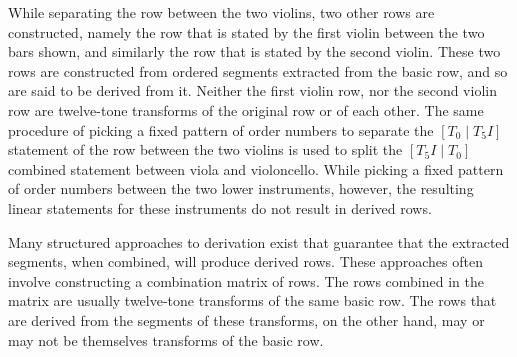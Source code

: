 \noindent While separating the row between the two violins, two other rows are constructed, namely the row that is stated by the first violin between the two bars shown, and similarly the row that is stated by the second violin. These two rows are constructed from ordered segments extracted from the basic row, and so are said to be derived from it. Neither the first violin row, nor the second violin row are twelve-tone transforms of the original row or of each other. The same procedure of picking a fixed pattern of order numbers to separate the $[T_0 \; | \; T_5I]$ statement of the row between the two violins is used to split the $[T_5I \; | \; T_0]$ combined statement between viola and violoncello. While picking a fixed pattern of order numbers between the two lower instruments, however, the resulting linear statements for these instruments do not result in derived rows.

Many structured approaches to derivation exist that guarantee that the extracted segments, when combined, will produce derived rows. These approaches often involve constructing a combination matrix of rows. The rows combined in the matrix are usually twelve-tone transforms of the same basic row. The rows that are derived from the segments of these transforms, on the other hand, may or may not be themselves transforms of the basic row.

